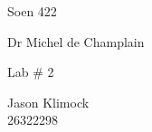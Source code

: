 \begin{titlepage}
	\centering
	{\Large Soen 422\par}
	Dr Michel de Champlain\\
	
	\vspace{50mm}
	{\Large Lab \#  2 \par}
	\vspace{100mm}
	Jason Klimock\\
	26322298
\end{titlepage}
